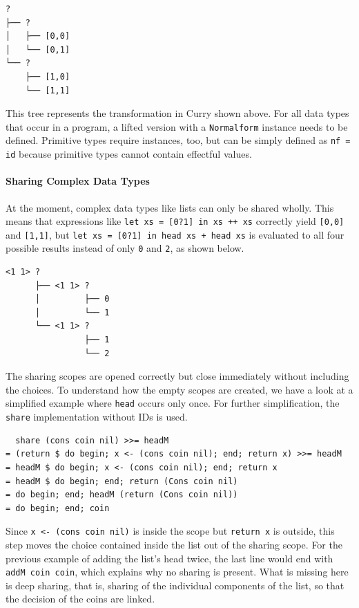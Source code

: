 \documentclass[a4paper, 11pt, fleqn, twoside, abstract=on]{scrreprt}
\newcommand{\hinl}[1]{\texttt{#1}}
\begin{document}
\begin{verbatim}
? 
├── ? 
│   ├── [0,0]
│   └── [0,1]
└── ? 
    ├── [1,0]
    └── [1,1]
\end{verbatim}

This tree represents the transformation in Curry shown above.
For all data types that occur in a program, a lifted version with a \hinl{Normalform} instance needs to be defined.
Primitive types require instances, too, but can be simply defined as \hinl{nf = id} because primitive types cannot contain effectful values.

\paragraph{Sharing Complex Data Types}
At the moment, complex data types like lists can only be shared wholly.
This means that expressions like \hinl{let xs = [0?1] in xs ++ xs} correctly yield \hinl{[0,0]} and \hinl{[1,1]}, but \hinl{let xs = [0?1] in head xs + head xs} is evaluated to all four possible results instead of only \hinl{0} and \hinl{2}, as shown below.

\begin{verbatim}
<1 1> ? 
      ├── <1 1> ? 
      │         ├── 0
      │         └── 1
      └── <1 1> ? 
                ├── 1
                └── 2
\end{verbatim}

The sharing scopes are opened correctly but close immediately without including the choices.
To understand how the empty scopes are created, we have a look at a simplified example where \hinl{head} occurs only once.
For further simplification, the \hinl{share} implementation without IDs is used.

\begin{verbatim}
  share (cons coin nil) >>= headM
= (return $ do begin; x <- (cons coin nil); end; return x) >>= headM
= headM $ do begin; x <- (cons coin nil); end; return x
= headM $ do begin; end; return (Cons coin nil)
= do begin; end; headM (return (Cons coin nil))
= do begin; end; coin
\end{verbatim}

Since \hinl{x <- (cons coin nil)} is inside the scope but \hinl{return x} is outside, this step moves the choice contained inside the list out of the sharing scope.
For the previous example of adding the list's head twice, the last line would end with \hinl{addM coin coin}, which explains why no sharing is present.
What is missing here is deep sharing, that is, sharing of the individual components of the list, so that the decision of the coins are linked.
\end{document}
